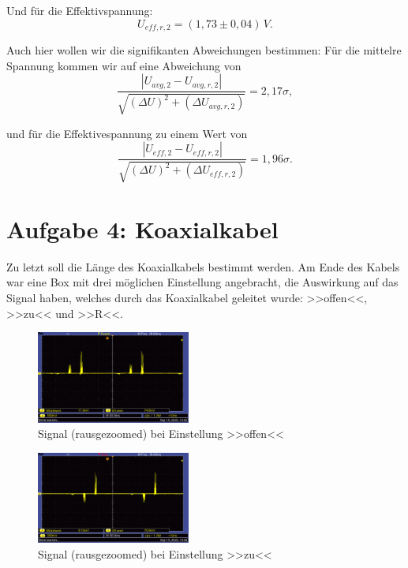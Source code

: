 Und für die Effektivspannung:
\begin{equation}
    \boxed{
        U_{eff,r,2} = (1,73 \pm 0,04) \, V
    }.
\end{equation}

Auch hier wollen wir die signifikanten Abweichungen bestimmen:
Für die mittelre Spannung kommen wir auf eine Abweichung von
\begin{equation}
    \frac{\left| U_{avg,2} - U_{avg,r,2}\right|}{\sqrt{(\Delta U)^2 + (\Delta  U_{avg,r,2})}} = 2,17\sigma,
\end{equation} 

und für die Effektivespannung zu einem Wert von
\begin{equation}
    \frac{\left| U_{eff,2} - U_{eff,r,2}\right|}{\sqrt{(\Delta U)^2 + (\Delta  U_{eff,r,2})}} = 1,96\sigma.
\end{equation} 


\section{Aufgabe 4: Koaxialkabel}
Zu letzt soll die Länge des Koaxialkabels bestimmt werden. Am Ende des Kabels war eine Box mit drei möglichen Einstellung angebracht, die Auswirkung auf das Signal haben, welches durch das Koaxialkabel geleitet wurde: >>offen<<, >>zu<< und >>R<<.

\begin{figure} [h!]
    \centering
        \includegraphics[width=0.45\textwidth]{img/25/Koaxial4/Koaxial-Kabel-offen.pdf}
    \caption{Signal (rausgezoomed) bei Einstellung >>offen<<}
    \label{fig:koax1}
\end{figure}

\begin{figure} [h!]
    \centering
        \includegraphics[width=0.45\textwidth]{img/25/Koaxial4/Koaxial-Kabel-zi.pdf}
    \caption{Signal (rausgezoomed) bei Einstellung >>zu<<}
    \label{fig:koax2}
\end{figure}

